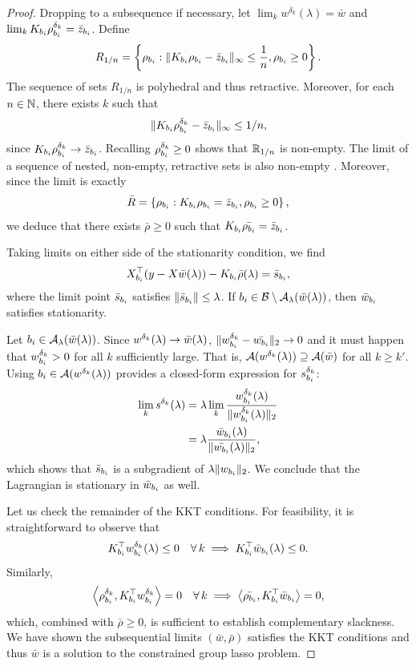 \begin{proof}
    Dropping to a subsequence if necessary, let \( \lim_{k} w^{\delta_k}(\lambda) = \bar w \)
    and \( \lim_k K_{{b_i}} \rho_{{b_i}}^{\delta_k} = \bar{z}_{{b_i}} \).
    Define
    \[
        R_{1/n} = \left\{\rho_{{b_i}} : \|K_{{b_i}} \rho_{{b_i}} - \bar{z}_{{b_i}}\|_\infty \leq \frac{1}{n}, \rho_{{b_i}} \geq 0\right\}.
    \]
    The sequence of sets \( R_{1/n} \) is polyhedral and thus retractive.
    Moreover, for each \( n \in \mathbb{N} \), there exists \( k \) such that
    \[ \|K_{{b_i}} \rho_{{b_i}}^{\delta_k} - \bar{z}_{{b_i}}\|_\infty \leq 1 / n, \]
    since \( K_{{b_i}} \rho_{{b_i}}^{\delta_k} \rightarrow \bar{z}_{{b_i}} \).
    Recalling \( \rho_{{b_i}}^{\delta_k} \geq 0 \) shows that \( \mathbb{R}_{1/n} \) is non-empty.
    The limit of a sequence of nested, non-empty, retractive sets is also
    non-empty \citep[Proposition 1.4.10]{bertsekas2009convex}.
    Moreover, since the limit is exactly
    \[
        \bar R = \left\{\rho_{{b_i}} : K_{{b_i}} \rho_{{b_i}} = \bar{z}_{{b_i}}, \rho_{{b_i}} \geq 0\right\},
    \]
    we deduce that there exists \( \bar \rho \geq 0 \) such that
    \( K_{{b_i}} \bar {\rho_{{b_i}}} = \bar{z}_{{b_i}} \).

    Taking limits on either side of the stationarity condition, we find
    \begin{align*}
        X_{b_i}^\top (y - X\bar w(\lambda)) - K_{{b_i}} \bar \rho(\lambda) = \bar s_{b_i},
    \end{align*}
    where the limit point \( \bar s_{b_i} \) satisfies \( \|\bar s_{b_i}\| \leq \lambda \).
    If \( {b_i} \in \mathcal{B} \setminus {\mathcal{A}_{\lambda}}(\bar w(\lambda)) \),
    then \( \bar{w}_{b_i} \) satisfies stationarity.

    Let \( {b_i} \in {\mathcal{A}_{\lambda}}(\bar w(\lambda)) \).
    Since \( w^{\delta_k}(\lambda) \rightarrow \bar w(\lambda) \),
    \( \|w_{b_i}^{\delta_k} - \bar {w_{b_i}}\|_2 \rightarrow 0 \)
    and it must happen that
    \( w_{b_i}^{\delta_k} > 0 \) for all \( k \) sufficiently large.
    That is,
    \( \mathcal{A}(w^{\delta_k}(\lambda)) \supseteq \mathcal{A}(\bar w) \)
    for all \( k \geq k' \).
    Using \( {b_i} \in \mathcal{A}(w^{\delta_k}(\lambda)) \)
    provides a closed-form expression for \( s_{b_i}^{\delta_k} \):
    \begin{align*}
        \lim_{k} s^{\delta_k}(\lambda)
         & = \lambda \lim_{k} \frac{w_{b_i}^{\delta_k}(\lambda)}{\|w_{b_i}^{\delta_k}(\lambda)\|_2} \\
         & = \lambda \frac{\bar{w}_{b_i}(\lambda)}{\|\bar {w_{b_i}}(\lambda)\|_2},
    \end{align*}
    which shows that \( \bar s_{b_i} \) is a subgradient of \( \lambda \|w_{b_i}\|_2 \).
    We conclude that the Lagrangian is stationary in \( \bar{w}_{b_i} \) as well.

    Let us check the remainder of the KKT conditions.
    For feasibility, it is straightforward to observe that
    \[
        K_{{b_i}}^\top w_{b_i}^{\delta_k}(\lambda) \leq 0 \quad \forall \, k \implies K_{{b_i}}^\top \bar{w}_{b_i}(\lambda) \leq 0.
    \]
    Similarly,
    \[
        \left\langle\rho_{{b_i}}^{\delta_k}, K_{{b_i}}^\top w_{b_i}^{\delta_k}\right\rangle = 0 \quad \forall \, k \implies \left\langle\bar {\rho_{{b_i}}}, K_{{b_i}}^\top \bar{w}_{b_i}\right\rangle = 0,
    \]
    which, combined with \( \bar \rho \geq 0 \), is sufficient to establish
    complementary slackness.
    We have shown the subsequential limits \( (\bar w, \bar \rho) \)
    satisfies the KKT conditions and thus \( \bar w \)
    is a solution to the constrained group lasso problem.


\end{proof}
